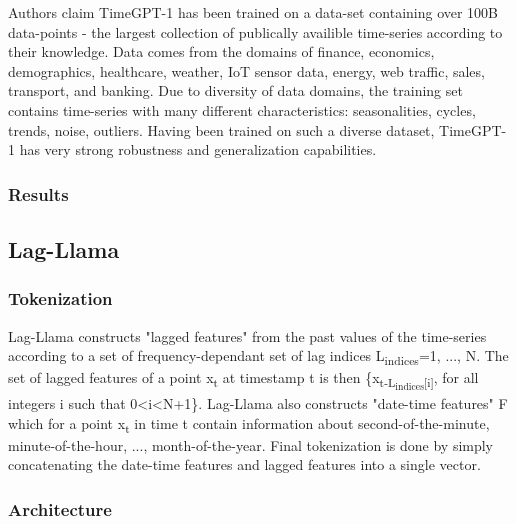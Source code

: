 Authors claim TimeGPT-1 has been trained on a data-set containing over 100B data-points - the largest collection of publically availible time-series according to their knowledge. Data comes from the domains of finance, economics, demographics, healthcare, weather, IoT sensor data, energy, web traffic, sales, transport, and banking. Due to diversity of data domains, the training set contains time-series with many different characteristics: seasonalities, cycles, trends, noise, outliers. Having been trained on such a diverse dataset, TimeGPT-1 has very strong robustness and generalization capabilities.

\subsubsection{Results}



\subsection{Lag-Llama \cite{rasul2023lag}}

\subsubsection{Tokenization}

Lag-Llama constructs "lagged features" from the past values of the time-series according to a set of frequency-dependant set of lag indices L\textsubscript{indices}={1, ..., N}. The set of lagged features of a point x\textsubscript{t} at timestamp t is then \{x\textsubscript{t-L\textsubscript{indices}[i]}, for all integers i such that 0<i<N+1\}. Lag-Llama also constructs "date-time features" F which for a point x\textsubscript{t} in time t contain information about second-of-the-minute, minute-of-the-hour, ..., month-of-the-year. Final tokenization is done by simply concatenating the date-time features and lagged features into a single vector.

\subsubsection{Architecture}

